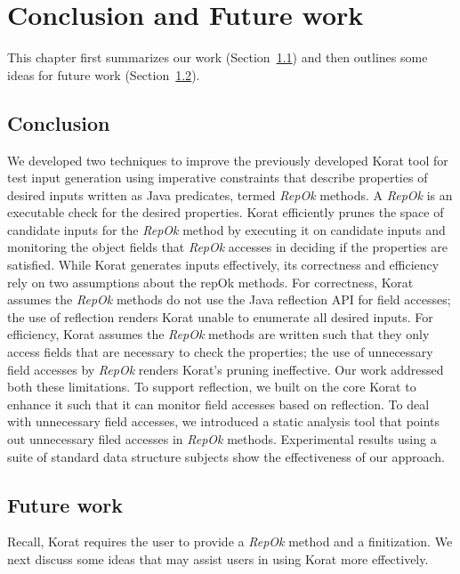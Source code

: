 \chapter{Conclusion and Future work}
\label{ch:conclusion-and-future-work}

This chapter first summarizes our work (Section~\ref{sec:conclusion}) and
then outlines some ideas for future work (Section~\ref{sec:future-work}).

\section{Conclusion}
\label{sec:conclusion}
We developed two techniques to improve the previously developed Korat
tool for test input generation using imperative constraints that
describe properties of desired inputs written as Java predicates,
termed \emph{RepOk} methods.  A \emph{RepOk} is an executable check
for the desired properties.  Korat efficiently prunes the space of
candidate inputs for the \emph{RepOk} method by executing it on
candidate inputs and monitoring the object fields that \emph{RepOk}
accesses in deciding if the properties are satisfied.  While Korat
generates inputs effectively, its correctness and efficiency rely on
two assumptions about the repOk methods.  For correctness, Korat
assumes the \emph{RepOk} methods do not use the Java reflection API
for field accesses; the use of reflection renders Korat unable to
enumerate all desired inputs.  For efficiency, Korat assumes the
\emph{RepOk} methods are written such that they only access fields
that are necessary to check the properties; the use of unnecessary
field accesses by \emph{RepOk} renders Korat's pruning ineffective.
Our work addressed both these limitations.  To support reflection, we
built on the core Korat to enhance it such that it can monitor field
accesses based on reflection.  To deal with unnecessary field
accesses, we introduced a static analysis tool that points out
unnecessary filed accesses in \emph{RepOk} methods. Experimental
results using a suite of standard data structure subjects show the
effectiveness of our approach.


\section{Future work}
\label{sec:future-work}
Recall, Korat requires the user to provide a \emph{RepOk} method and a
finitization.  We next discuss some ideas that may assist users in
using Korat more effectively.

